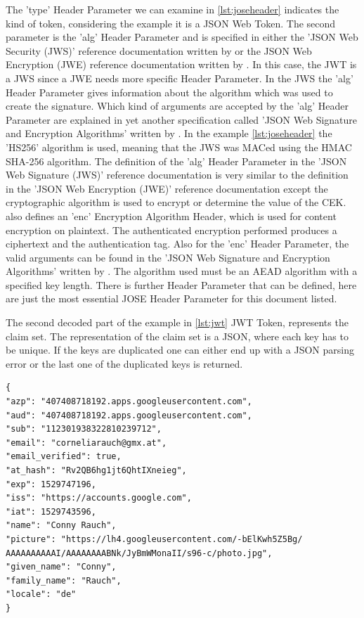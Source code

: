 The 'type' Header Parameter we can examine in \ref{lst:joseheader} indicates the kind of token, considering the example it is a JSON Web Token. The second parameter is the 'alg' Header Parameter and is specified in either the 'JSON Web Security (JWS)' reference documentation written by \cite{JWS:IETF:Jones:2015} or the JSON Web Encryption (JWE) reference documentation written by \cite{JWE:IETF:Jones:2015}. In this case, the JWT is a JWS since a JWE needs more specific Header Parameter. In the JWS the 'alg' Header Parameter gives information about the algorithm which was used to create the signature. Which kind of arguments are accepted by the 'alg' Header Parameter are explained in yet another specification called 'JSON Web Signature and Encryption Algorithms' written by \cite{JWA:Jones:2015}. In the example \ref{lst:joseheader} the 'HS256' algorithm is used, meaning that the JWS was MACed using the HMAC SHA-256 algorithm. The definition of the 'alg' Header Parameter in the 'JSON Web Signature (JWS)' reference documentation is very similar to the definition in the 'JSON Web Encryption (JWE)' reference documentation except the cryptographic algorithm is used to encrypt or determine the value of the CEK. \cite{JWE:IETF:Jones:2015} also defines an 'enc' Encryption Algorithm Header, which is used for content encryption on plaintext. The authenticated encryption performed produces a ciphertext and the authentication tag. Also for the 'enc' Header Parameter, the valid arguments can be found in the 'JSON Web Signature and Encryption Algorithms' written by \cite{JWA:Jones:2015}. The algorithm used must be an AEAD algorithm with a specified key length. There is further Header Parameter that can be defined, here are just the most essential JOSE Header Parameter for this document listed. 

The second decoded part of the example in \ref{lst:jwt} JWT Token, represents the claim set. The representation of the claim set is a JSON, where each key has to be unique. If the keys are duplicated one can either end up with a JSON parsing error or the last one of the duplicated keys is returned. 

\begin{lstlisting}
{
"azp": "407408718192.apps.googleusercontent.com",
"aud": "407408718192.apps.googleusercontent.com",
"sub": "112301938322810239712",
"email": "corneliarauch@gmx.at",
"email_verified": true,
"at_hash": "Rv2QB6hg1jt6QhtIXneieg",
"exp": 1529747196,
"iss": "https://accounts.google.com",
"iat": 1529743596,
"name": "Conny Rauch",
"picture": "https://lh4.googleusercontent.com/-bElKwh5Z5Bg/
AAAAAAAAAAI/AAAAAAAABNk/JyBmWMonaII/s96-c/photo.jpg",
"given_name": "Conny",
"family_name": "Rauch",
"locale": "de"
}
\end{lstlisting}

